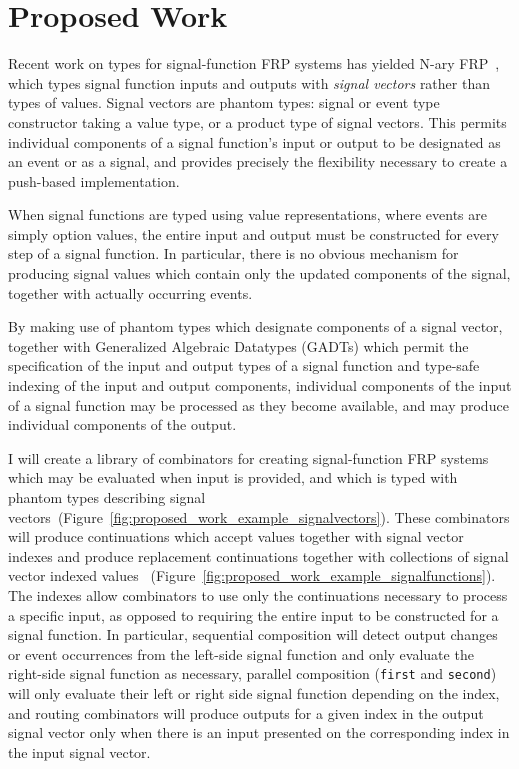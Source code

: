 \section{Proposed Work}
\label{section:ProposedWork}

Recent work on types for signal-function FRP systems has yielded N-ary FRP~\cite{Sculthorpe2011}, which types signal function inputs and outputs
with {\em signal vectors} rather than types of values. Signal vectors are phantom types: signal or event type constructor taking a value type,
or a product type of signal vectors. This permits individual components of a signal function's input or output to be designated as an event
or as a signal, and provides precisely the flexibility necessary to create a push-based implementation.

When signal functions are typed using value representations, where events are simply option values, the entire input and output must be constructed
for every step of a signal function. In particular, there is no obvious mechanism for producing signal values which contain only the updated components
of the signal, together with actually occurring events. 

By making use of phantom types which designate components of a signal vector, together with Generalized Algebraic Datatypes (GADTs) which
permit the specification of the input and output types of a signal function and type-safe indexing of the input and output components,
individual components of the input of a signal function may be processed as they become available, and may produce individual components of
the output.

I will create a library of combinators for creating signal-function FRP systems which may be evaluated when input is provided, and which
is typed with phantom types describing signal vectors~(Figure~\ref{fig:proposed_work_example_signalvectors}). These combinators will produce continuations
which accept values together with signal vector indexes and produce replacement continuations together with collections of signal vector indexed values
~(Figure~\ref{fig:proposed_work_example_signalfunctions}). 
The indexes allow combinators to use only the continuations necessary to process a specific input, as opposed to requiring the entire input
to be constructed for a signal function. In particular, sequential composition will detect output changes or event
occurrences from the left-side signal function and only evaluate the right-side signal function as necessary, parallel composition ({\tt first} and {\tt second})
will only evaluate their left or right side signal function depending on the index, and routing combinators will produce outputs for a given index
in the output signal vector only when there is an input presented on the corresponding index in the input signal vector. 

